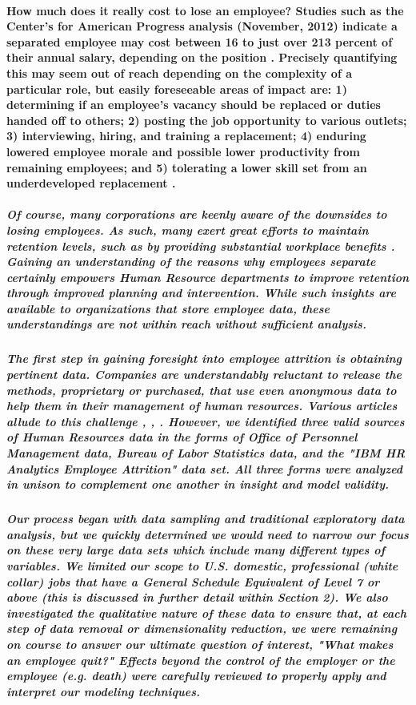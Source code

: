\documentclass[10pt]{article}
\begin{document}
\paragraph{How much does it really cost to lose an employee? Studies such as the Center’s for American Progress analysis (November, 2012) indicate a separated employee may cost between 16 to just over 213 percent of their annual salary, depending on the position \cite{boushey}. Precisely quantifying this may seem out of reach depending on the complexity of a particular role, but easily foreseeable areas of impact are: 1) determining if an employee’s vacancy should be replaced or duties handed off to others; 2) posting the job opportunity to various outlets; 3) interviewing, hiring, and training a replacement; 4) enduring lowered employee morale and possible lower productivity from 
 remaining employees; and 5) tolerating a lower skill set from an underdeveloped replacement \cite{kantor}.}

\subparagraph{Of course, many corporations are keenly aware of the downsides to losing employees.  As such, many exert great efforts to maintain retention levels, such as by providing substantial workplace benefits \cite{glassdoor}. Gaining an understanding of the reasons why employees separate certainly empowers Human Resource departments to improve retention through improved planning and intervention.  While such insights are available to organizations that store employee data, these understandings are not within reach without sufficient analysis.}

\subparagraph{The first step in gaining foresight into employee attrition is obtaining pertinent data. Companies are understandably reluctant to release the methods, proprietary or purchased, that use even anonymous data to help them in their management of human resources. Various articles allude to this challenge \cite{abellin}, \cite{richter}, \cite{walker}. However, we identified three valid sources of Human Resources data in the forms of Office of Personnel Management data, Bureau of Labor Statistics data, and the "IBM HR Analytics Employee Attrition" data set. All three forms were analyzed in unison to complement one another in insight and model validity.}

\subparagraph{Our process began with data sampling and traditional exploratory data analysis, but we quickly determined we would need to narrow our focus on these very large data sets which include many different types of variables.  We limited our scope to U.S. domestic, professional (white collar) jobs that have a General Schedule Equivalent of Level 7 or above (this is discussed in further detail within Section 2).  We also investigated the qualitative nature of these data to ensure that, at each step of data removal or dimensionality reduction, we were remaining on course to answer our ultimate question of interest, "What makes an employee quit?" Effects beyond the control of the employer or the employee (e.g. death) were carefully reviewed to properly apply and interpret our modeling techniques.}
\end{document}
